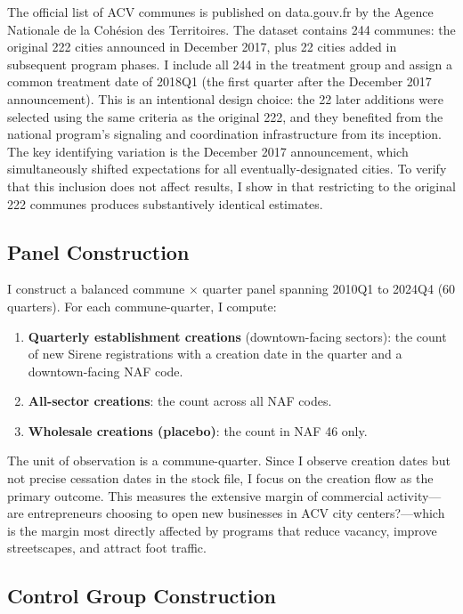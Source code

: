\documentclass[12pt]{article}
\begin{document}
The official list of ACV communes is published on data.gouv.fr by the Agence Nationale de la Coh\'esion des Territoires. The dataset contains 244 communes: the original 222 cities announced in December 2017, plus 22 cities added in subsequent program phases. I include all 244 in the treatment group and assign a common treatment date of 2018Q1 (the first quarter after the December 2017 announcement). This is an intentional design choice: the 22 later additions were selected using the same criteria as the original 222, and they benefited from the national program's signaling and coordination infrastructure from its inception. The key identifying variation is the December 2017 announcement, which simultaneously shifted expectations for all eventually-designated cities. To verify that this inclusion does not affect results, I show in  that restricting to the original 222 communes produces substantively identical estimates.

\subsection{Panel Construction}

I construct a balanced commune $\times$ quarter panel spanning 2010Q1 to 2024Q4 (60 quarters). For each commune-quarter, I compute:
\begin{enumerate}
    \item \textbf{Quarterly establishment creations} (downtown-facing sectors): the count of new Sirene registrations with a creation date in the quarter and a downtown-facing NAF code.
    \item \textbf{All-sector creations}: the count across all NAF codes.
    \item \textbf{Wholesale creations (placebo)}: the count in NAF 46 only.
\end{enumerate}

The unit of observation is a commune-quarter. Since I observe creation dates but not precise cessation dates in the stock file, I focus on the creation flow as the primary outcome. This measures the extensive margin of commercial activity---are entrepreneurs choosing to open new businesses in ACV city centers?---which is the margin most directly affected by programs that reduce vacancy, improve streetscapes, and attract foot traffic.

\subsection{Control Group Construction}
\end{document}
